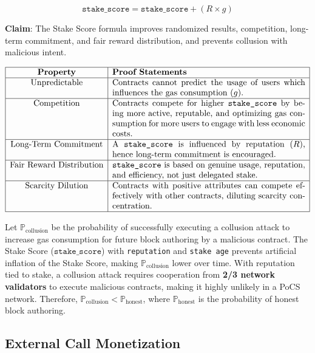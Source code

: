 \documentclass{article}
\begin{document}
\begin{equation}
\texttt{stake\_score} = \texttt{stake\_score} + (R \times g)
\end{equation}

\textbf{Claim}: The Stake Score formula improves randomized results, competition, long-term commitment, and fair reward distribution, and prevents collusion with malicious intent.

\[
\begin{array}{|c|p{8cm}|}
\hline
\textbf{Property} & \textbf{Proof Statements} \\
\hline
\text{Unpredictable} & Contracts cannot predict the usage of users which influences the gas consumption ($g$). \\
\hline
\text{Competition} & Contracts compete for higher $\texttt{stake\_score}$ by being more active, reputable, and optimizing gas consumption for more users to engage with less economic costs. \\
\hline
\text{Long-Term Commitment} & A $\texttt{stake\_score}$ is influenced by reputation ($R$), hence long-term commitment is encouraged. \\
\hline
\text{Fair Reward Distribution} & $\texttt{stake\_score}$ is based on genuine usage, reputation, and efficiency, not just delegated stake. \\
\hline
\text{Scarcity Dilution} & Contracts with positive attributes can compete effectively with other contracts, diluting scarcity concentration. \\
\hline
\end{array}
\]

Let $\mathbb{P}_{\text{collusion}}$ be the probability of successfully executing a collusion attack to increase gas consumption for future block authoring by a malicious contract. The Stake Score ($\texttt{stake\_score}$) with \texttt{reputation} and \texttt{stake age} prevents artificial inflation of the Stake Score, making $\mathbb{P}_{\text{collusion}}$ lower over time. With reputation tied to stake, a collusion attack requires cooperation from \textbf{2/3 network validators} to execute malicious contracts, making it highly unlikely in a PoCS network. Therefore, $\mathbb{P}_{\text{collusion}} < \mathbb{P}_{\text{honest}}$, where $\mathbb{P}_{\text{honest}}$ is the probability of honest block authoring.

\subsection{External Call Monetization}
\end{document}
